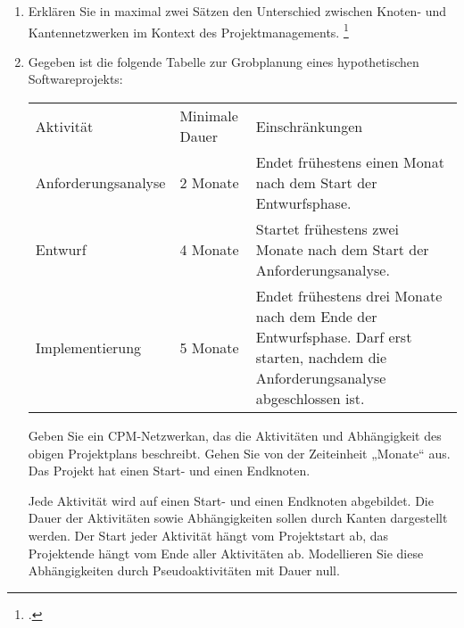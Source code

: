\documentclass{lehramt-informatik-aufgabe}
\begin{document}

\begin{enumerate}


\item Erklären Sie in maximal zwei Sätzen den Unterschied zwischen
Knoten- und Kantennetzwerken im Kontext des Projektmanagements.
\footcite{examen:66116:2016:03}


\item Gegeben ist die folgende Tabelle zur Grobplanung eines
hypothetischen Softwareprojekts:

\begin{tabularx}{\linewidth}{llX}
Aktivität & Minimale Dauer & Einschränkungen\\

Anforderungsanalyse &
2 Monate &
Endet frühestens einen Monat nach dem
Start der Entwurfsphase. \\

Entwurf & 4 Monate &
Startet frühestens zwei Monate nach dem Start der
Anforderungsanalyse. \\

Implementierung & 5 Monate&

Endet frühestens drei Monate nach dem Ende der
Entwurfsphase. Darf erst starten, nachdem die
Anforderungsanalyse abgeschlossen ist.\\
\end{tabularx}

Geben Sie ein CPM-Netzwerkan, das die Aktivitäten und Abhängigkeit des
obigen Projektplans beschreibt. Gehen Sie von der Zeiteinheit „Monate“
aus. Das Projekt hat einen Start- und einen Endknoten.

Jede Aktivität wird auf einen Start- und einen Endknoten abgebildet. Die
Dauer der Aktivitäten sowie Abhängigkeiten sollen durch Kanten
dargestellt werden. Der Start jeder Aktivität hängt vom Projektstart ab,
das Projektende hängt vom Ende aller Aktivitäten ab. Modellieren Sie
diese Abhängigkeiten durch Pseudoaktivitäten mit Dauer null.


\end{enumerate}
\end{document}
